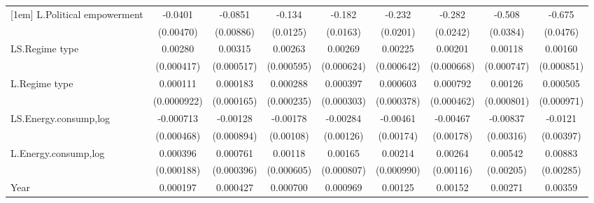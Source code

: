 \begin{table}[htbp]
\begin{tabular}{l*{8}{c}}
[1em]
L.Political empowerment&     -0.0401\sym{***}&     -0.0851\sym{***}&      -0.134\sym{***}&      -0.182\sym{***}&      -0.232\sym{***}&      -0.282\sym{***}&      -0.508\sym{***}&      -0.675\sym{***}\\
                    &   (0.00470)         &   (0.00886)         &    (0.0125)         &    (0.0163)         &    (0.0201)         &    (0.0242)         &    (0.0384)         &    (0.0476)         \\
[1em]
LS.Regime type      &     0.00280\sym{***}&     0.00315\sym{***}&     0.00263\sym{***}&     0.00269\sym{***}&     0.00225\sym{***}&     0.00201\sym{***}&     0.00118         &     0.00160\sym{*}  \\
                    &  (0.000417)         &  (0.000517)         &  (0.000595)         &  (0.000624)         &  (0.000642)         &  (0.000668)         &  (0.000747)         &  (0.000851)         \\
[1em]
L.Regime type       &    0.000111         &    0.000183         &    0.000288         &    0.000397         &    0.000603         &    0.000792\sym{*}  &     0.00126         &    0.000505         \\
                    & (0.0000922)         &  (0.000165)         &  (0.000235)         &  (0.000303)         &  (0.000378)         &  (0.000462)         &  (0.000801)         &  (0.000971)         \\
[1em]
LS.Energy.consump,log&   -0.000713         &    -0.00128         &    -0.00178         &    -0.00284\sym{**} &    -0.00461\sym{***}&    -0.00467\sym{***}&    -0.00837\sym{***}&     -0.0121\sym{***}\\
                    &  (0.000468)         &  (0.000894)         &   (0.00108)         &   (0.00126)         &   (0.00174)         &   (0.00178)         &   (0.00316)         &   (0.00397)         \\
[1em]
L.Energy.consump,log&    0.000396\sym{**} &    0.000761\sym{*}  &     0.00118\sym{*}  &     0.00165\sym{**} &     0.00214\sym{**} &     0.00264\sym{**} &     0.00542\sym{***}&     0.00883\sym{***}\\
                    &  (0.000188)         &  (0.000396)         &  (0.000605)         &  (0.000807)         &  (0.000990)         &   (0.00116)         &   (0.00205)         &   (0.00285)         \\
[1em]
Year                &    0.000197\sym{***}&    0.000427\sym{***}&    0.000700\sym{***}&    0.000969\sym{***}&     0.00125\sym{***}&     0.00152\sym{***}&     0.00271\sym{***}&     0.00359\sym{***}\\

\end{tabular}
\end{table}
